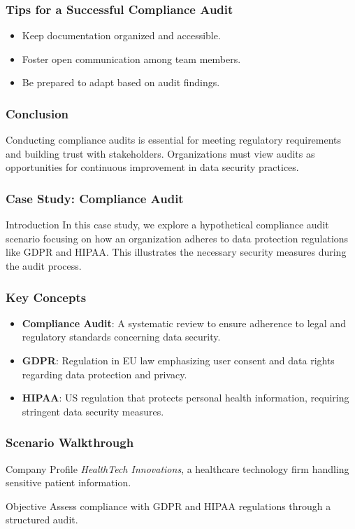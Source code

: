 \documentclass{beamer}
\begin{document}
\begin{frame}[fragile]
    \frametitle{Tips for a Successful Compliance Audit}
    \begin{itemize}
        \item Keep documentation organized and accessible.
        \item Foster open communication among team members.
        \item Be prepared to adapt based on audit findings.
    \end{itemize}
\end{frame}

\begin{frame}[fragile]
    \frametitle{Conclusion}
    Conducting compliance audits is essential for meeting regulatory requirements and building trust with stakeholders. Organizations must view audits as opportunities for continuous improvement in data security practices.
\end{frame}

\begin{frame}[fragile]
    \frametitle{Case Study: Compliance Audit}
    \begin{block}{Introduction}
        In this case study, we explore a hypothetical compliance audit scenario focusing on how an organization adheres to data protection regulations like GDPR and HIPAA. This illustrates the necessary security measures during the audit process.
    \end{block}
\end{frame}

\begin{frame}[fragile]
    \frametitle{Key Concepts}
    \begin{itemize}
        \item \textbf{Compliance Audit}: A systematic review to ensure adherence to legal and regulatory standards concerning data security.
        \item \textbf{GDPR}: Regulation in EU law emphasizing user consent and data rights regarding data protection and privacy.
        \item \textbf{HIPAA}: US regulation that protects personal health information, requiring stringent data security measures.
    \end{itemize}
\end{frame}

\begin{frame}[fragile]
    \frametitle{Scenario Walkthrough}
    \begin{block}{Company Profile}
        \textit{HealthTech Innovations}, a healthcare technology firm handling sensitive patient information.
    \end{block}
    
    \begin{block}{Objective}
        Assess compliance with GDPR and HIPAA regulations through a structured audit.
    \end{block}
\end{frame}
\end{document}
